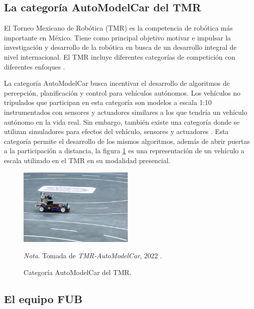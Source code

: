 \subsection{La categoría AutoModelCar del TMR} \label{sub:la_categoría_autoModelCar_del_TMR}

El Torneo Mexicano de Robótica (TMR) es la competencia de robótica más importante en México. Tiene como principal objetivo motivar e impulsar la investigación y desarrollo de la robótica en busca de un desarrollo integral de nivel internacional. El TMR incluye diferentes categorías de competición con diferentes enfoques \cite{tmr}.

La categoría AutoModelCar busca incentivar el desarrollo de algoritmos de percepción, planificación y control para vehículos autónomos. Los vehículos no tripulados que participan en esta categoría son modelos a escala 1:10 instrumentados con sensores y actuadores similares a los que tendría un vehículo autónomo en la vida real. Sin embargo, también existe una categoría donde se utilizan simuladores para efectos del vehículo, sensores y actuadores \cite{AutoModelCar}. Esta categoría permite el desarrollo de los mismos algoritmos, además de abrir puertas a la participación a distancia, la figura \ref{fig:tmr_auto_model_car} es una representación de un vehículo a escala utilizado en el TMR en su modalidad presencial. 
\begin{figure}[h]
    \centering
    \includegraphics[width=0.5\textwidth]{Figures/Figures_Cap02/automodel_car.jpg}
    \caption{Categoría AutoModelCar del TMR.}
    \textit{Nota}. Tomada de \textit{TMR-AutoModelCar}, 2022 \cite{AutoModelCar}.
    \label{fig:tmr_auto_model_car}
\end{figure}

\subsection{El equipo FUB} \label{sub:el_equipo_FUB}

